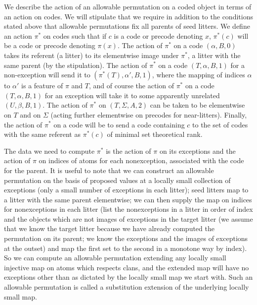 \documentclass{article}
\begin{document}
We describe the action of an allowable permutation on a coded object in terms of an action on codes.   We will stipulate that we require in addition to the conditions stated above that allowable permutations fix all parents of seed litters.  We define an action $\pi^*$ on codes
such that if $c$ is a code or precode denoting $x$, $\pi^*(c)$ will be a code or precode denoting $\pi(x)$.   The action of $\pi^*$ on a code  $(\alpha,B,0)$ takes its referent
(a litter) to its elementwise image under $\pi^*$, a litter with the same parent (by the stipulation).
The action of $\pi^*$ on a code $(T,\alpha,B,1)$ for a non-exception will send it to $(\pi^*(T),\alpha',B,1)$, where the mapping of indices $\alpha$ to $\alpha'$ is a feature
of $\pi$ and $T$, and of course the action of $\pi^*$ on a code $(T,\alpha,B,1)$ for an exception will take it to some apparently unrelated $(U,\beta,B,1)$.
The action of $\pi^*$ on $(T,\Sigma,A,2)$ can be taken to be elementwise on $T$ and on $\Sigma$ (acting further elementwise on precodes for near-litters).  Finally,
the action of $\pi^*$ on a code will be to send a code containing $c$ to the set of codes with the same referent as $\pi^*(c)$ of minimal set theoretical rank.

The data we need to compute $\pi^*$ is the action of $\pi$ on its exceptions and the action of
$\pi$ on indices of atoms for each nonexception, associated with the code for the parent.
It is useful to note that we can construct an allowable permutation on the basis of proposed values at a locally small collection of exceptions (only a small number of exceptions in each litter);  seed litters map to a litter with the same parent elementwise; 
we can then supply the map on indices for  nonexceptions in each litter (list the nonexceptions in a litter in order of index
and the objects which are not images of exceptions in the target litter (we assume that we know the target litter because we have already computed the permutation on its parent; we know the exceptions and the images of exceptions at the outset) and map the first set to the second in a monotone way by index).  So we can compute an allowable permutation
extending any locally small injective map on atoms which respects clans, and the extended map will have no exceptions other than as dictated by the locally small map we start with.  Such an allowable permutation is called a substitution extension of the underlying locally small map.
\end{document}
